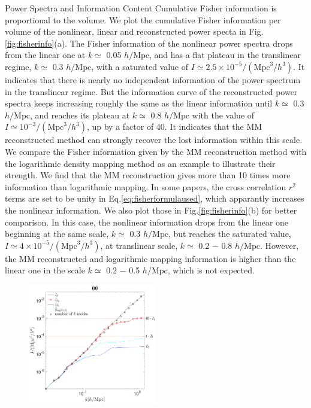 \begin{section}{Power Spectra and Information Content}
  Cumulative Fisher information is proportional to the volume. We plot the 
cumulative Fisher information per volume of the nonlinear, linear and reconstructed power specta in 
Fig.\ref{fig:fisherinfo}(a). The Fisher information of the nonlinear power spectra drops 
from the linear one at $k \simeq$ 0.05 $h/\mathrm{Mpc}$, and has a flat plateau in the translinear regime, 
$k\simeq$ 0.3 $h/\mathrm{Mpc}$, with 
a saturated value of $I \simeq 2.5 \times 10^{-5}/(\mathrm{Mpc}^3/h^3)$. It 
indicates that there is nearly no independent information of the power
spectrum in the translinear regime.
But the information curve of 
the reconstructed power spectra keeps increasing roughly the same as 
the linear information until $k\simeq$ 0.3 $h/\mathrm{Mpc}$, and reaches its plateau at $k\simeq$ 0.8 $h/\mathrm{Mpc}$ with the 
value of $I \simeq  10^{-3}/(\mathrm{Mpc}^3/h^3)$, up by a factor of  40. 
It indicates that the MM reconstructed method can strongly recover the lost information 
within this scale. We compare the Fisher information given by the MM reconstruction method with 
the logarithmic density mapping method \cite{bib:Mark2009} as an example to illustrate their strength. 
We find that the MM reconstruction gives more than 10 times more information than logarithmic mapping. 
In some papers, the cross correlation $r^2$ terms are set to be unity in Eq.\ref{eq:fisherformulaused}, which 
apparantly increases the nonlinear information. We also plot those in Fig.\ref{fig:fisherinfo}(b) 
for better comparison. In this case, the nonlinear information drops from the linear one beginning at the same scale, 
$k\simeq$ 0.3 $h/\mathrm{Mpc}$, but reaches the saturated value, $I \simeq 4 \times 10^{-5}/(\mathrm{Mpc}^3/h^3)$, at translinear 
scale, $k \simeq $ 0.2 $-$ 0.8 $h/\mathrm{Mpc}$. However, the MM reconstructed and logarithmic mapping information 
is higher than the linear one in the scale 
$k \simeq$ 0.2 $-$ 0.5 $h/\mathrm{Mpc}$, which is not expected. 
\begin{figure}
  \includegraphics[width=0.5\textwidth]{fisher_r2_best_analysis-crop.pdf}

\end{figure}
\end{section}
